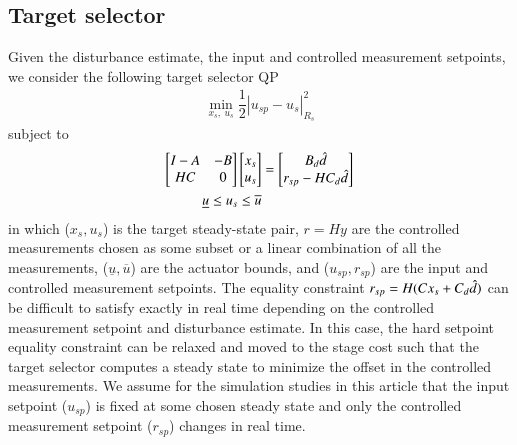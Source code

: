 \documentclass[preprint,5p, twocolumn, authoryear]{elsarticle}
\begin{document}
\subsection{Target selector}
Given the disturbance estimate, the input and controlled measurement setpoints,
we consider the following target selector QP
\begin{align}
    \min_{x_s, \ u_s}  \dfrac{1}{2} |u_{sp} - u_s|^2_{R_s}
\end{align}
subject to
\begin{align}  
    \begin{bmatrix}
        I -A & -B \\
        HC & 0
    \end{bmatrix} \begin{bmatrix}
        x_s \\
        u_s
    \end{bmatrix} &= \begin{bmatrix}
        B_d\hat{d} \\
        r_{sp} - HC_d\hat{d}
    \end{bmatrix} \\
    \underline{u} \leq u_s \leq \overline{u}
\end{align}
in which ($x_s, u_s$) is the target steady-state pair, $r=Hy$ are the controlled
measurements chosen as some subset or a linear combination of all the
measurements, ($\underline{u}, \overline{u}$) are the actuator bounds, and
($u_{sp}, r_{sp}$) are the input and controlled measurement setpoints. The
equality constraint $r_{sp} = H(Cx_s + C_d\hat{d})$ can be difficult to satisfy
exactly in real time depending on the controlled measurement setpoint and
disturbance estimate. In this case, the hard setpoint equality constraint can be
relaxed and moved to the stage cost such that the target selector computes a
steady state to minimize the offset in the controlled measurements. We assume
for the simulation studies in this article that the input setpoint ($u_{sp}$) is
fixed at some chosen steady state and only the controlled measurement setpoint
($r_{sp}$) changes in real time.
\end{document}
